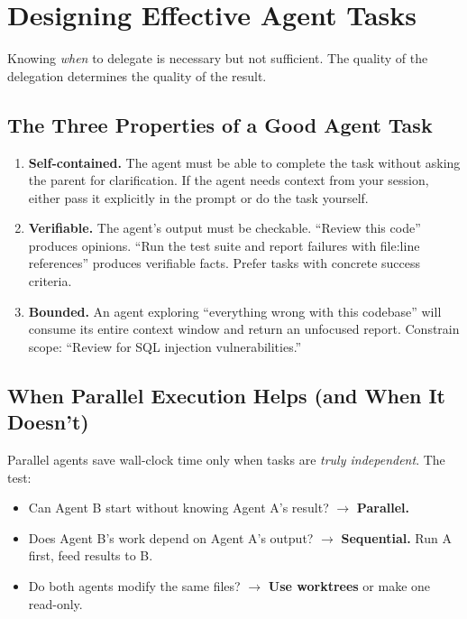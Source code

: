 \section{Designing Effective Agent Tasks}
\label{sec:agent-design}


Knowing \emph{when} to delegate is necessary but not sufficient.
The quality of the delegation determines the quality of the result.

\subsection*{The Three Properties of a Good Agent Task}

\begin{enumerate}
  \item \textbf{Self-contained.} The agent must be able to complete
    the task without asking the parent for clarification. If the agent
    needs context from your session, either pass it explicitly in the
    prompt or do the task yourself.

  \item \textbf{Verifiable.} The agent's output must be checkable.
    ``Review this code'' produces opinions. ``Run the test suite and
    report failures with file:line references'' produces verifiable facts.
    Prefer tasks with concrete success criteria.

  \item \textbf{Bounded.} An agent exploring ``everything wrong with
    this codebase'' will consume its entire context window and return
    an unfocused report. Constrain scope: ``Review 
    for SQL injection vulnerabilities.''
\end{enumerate}

\subsection*{When Parallel Execution Helps (and When It Doesn't)}

Parallel agents save wall-clock time only when tasks are
\emph{truly independent}. The test:

\begin{itemize}
  \item Can Agent B start without knowing Agent A's result?
    $\rightarrow$ \textbf{Parallel.}
  \item Does Agent B's work depend on Agent A's output?
    $\rightarrow$ \textbf{Sequential.} Run A first, feed results to B.
  \item Do both agents modify the same files?
    $\rightarrow$ \textbf{Use worktrees} or make one read-only.
\end{itemize}

